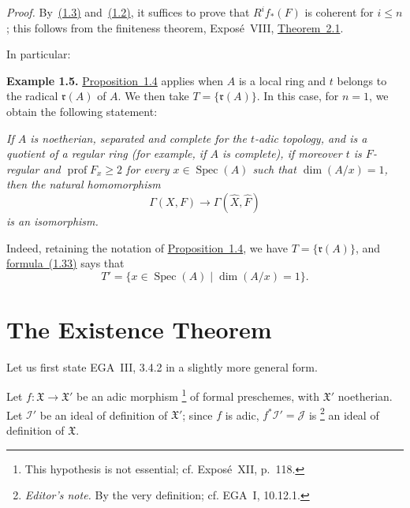\documentclass[11pt,a4paper,oneside]{book}
\providecommand{\markedfootnote}[2]{%
  \begingroup\renewcommand{\thefootnote}{#1}\footnote{#2}\endgroup}
\providecommand{\prof}{\operatorname{prof}}
\theoremstyle{plain}
\theoremstyle{definition}
\theoremstyle{remark}
\begin{document}
\noindent\emph{Proof.}\quad
By~\hyperref[eq:IX.1.3]{(1.3)} and~\hyperref[eq:IX.1.2]{(1.2)}, it suffices to prove that $R^i f_*(F)$ is coherent for
$i\le n$; this follows from the finiteness theorem, Expos\'e~VIII,
\hyperref[IX.2.1]{Theorem~2.1}.

\medskip
\noindent In particular:

\noindent\textbf{Example 1.5.}\quad
\hyperref[IX.1.4]{Proposition~1.4} applies when $A$ is a local ring and $t$ belongs to the
radical $\mathfrak r(A)$ of $A$. We then take
$T=\{\mathfrak r(A)\}$. In this case, for $n=1$, we obtain the following
statement:

\medskip
{\itshape If $A$ is noetherian, separated and complete for the $t$-adic
topology, and is a quotient of a regular ring (for example, if $A$ is
complete), if moreover $t$ is $F$-regular and $\prof F_x\ge2$ for every
$x\in\operatorname{Spec}(A)$ such that $\dim(A/x)=1$, then the natural
homomorphism
\[
  \Gamma(X,F)\longrightarrow\Gamma(\widehat X,\widehat F)
\]
is an isomorphism.}

\medskip
Indeed, retaining the notation of \hyperref[IX.1.4]{Proposition~1.4}, we have
$T=\{\mathfrak r(A)\}$, and \hyperref[eq:IX.1.33]{formula~(1.33)} says that
\[
  T'=\{x\in\operatorname{Spec}(A)\mid\dim(A/x)=1\}.
\]

\medskip
{}

\setcounter{section}{1}
\section{The Existence Theorem}\label{IX.2}

Let us first state EGA~III, 3.4.2 in a slightly more general form.

Let $f:\mathfrak X\to\mathfrak X'$ be an adic
morphism\markedfootnote{(*)}{This hypothesis is not essential; cf.
Expos\'e~XII, p.~118.} of formal preschemes, with $\mathfrak X'$ noetherian.
Let $\mathcal I'$ be an ideal of definition of $\mathfrak X'$; since $f$ is
adic,
$f^*\mathcal I'=\mathcal J$ is\markedfootnote{(2)}{\textit{Editor's note.}
By the very definition; cf. EGA~I, 10.12.1.} an ideal of definition of
$\mathfrak X$.
\end{document}
